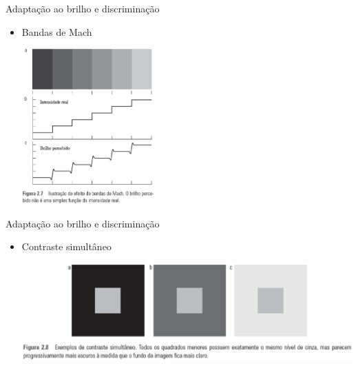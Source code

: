       \begin{slide}[toc=]{Adaptação ao brilho e discriminação}
         \begin{itemize}
            \item Bandas de Mach
            \begin{center}
               \includegraphics[width=0.4\textwidth]{figs/bmach_gw.eps}
            \end{center}
         \end{itemize}
      \end{slide}

      \begin{slide}[toc=]{Adaptação ao brilho e discriminação}
         \begin{itemize}
            \item Contraste simultâneo
            \begin{center}
               \includegraphics[width=\textwidth]{figs/csimul_gw.eps}
            \end{center}
         \end{itemize}
      \end{slide}

     
      
